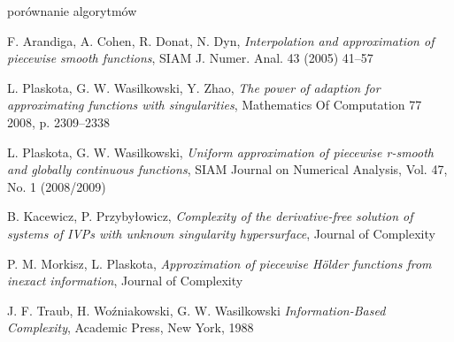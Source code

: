 \documentclass[oik, pdftex, robocza, man]{mgrwms}
\begin{document}
porównanie algorytmów


\mgrclosechapter



%  
\begin{thebibliography}{88}

    F. Arandiga, A. Cohen, R. Donat, N. Dyn,
    \emph{Interpolation and approximation of piecewise smooth functions}, SIAM J. Numer. Anal. 43 (2005) 41–57

    L. Plaskota, G. W. Wasilkowski, Y. Zhao, 
    \emph{The power of adaption for approximating functions with singularities}, Mathematics Of Computation 77
    2008, p. 2309–2338

    L. Plaskota, G. W. Wasilkowski, 
    \emph{Uniform approximation of piecewise r-smooth and globally continuous functions}, SIAM Journal on Numerical
    Analysis, Vol. 47, No. 1 (2008/2009)

    B. Kacewicz, P. Przybyłowicz, 
    \emph{Complexity of the derivative-free solution of
    systems of IVPs with unknown singularity hypersurface}, Journal of Complexity
    
    P. M. Morkisz, L. Plaskota, 
    \emph{Approximation of piecewise Hölder functions from inexact information}, Journal of Complexity

    J. F. Traub, H. Woźniakowski, G. W. Wasilkowski
    \emph{Information-Based Complexity}, Academic Press, New York, 1988

\end{thebibliography}
\end{document}

